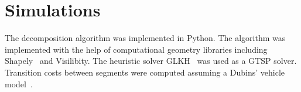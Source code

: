 \documentclass[../main.tex]{subfiles}
\begin{document}
\section{Simulations}
\label{section:single_agent_simulation}
The decomposition algorithm was implemented in Python. The algorithm was implemented with the help of computational geometry libraries including Shapely~\cite{Shapely:13} and Visilibity\cite{VisiLibity:08}. The heuristic solver GLKH~\cite{helsgaun2000effective} was used as a GTSP solver. Transition costs between segments were computed assuming a Dubins' vehicle model~\cite{dubins1957curves}.



%
\end{document}

